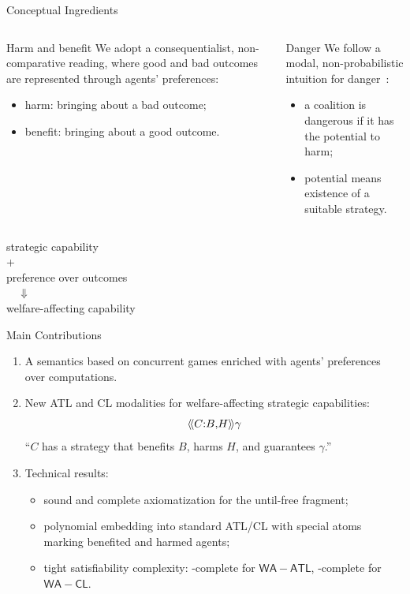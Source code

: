 \documentclass[aspectratio=169,10pt]{beamer}
\newcommand{\WATL}{\ensuremath{\mathsf{WA{-}ATL}}\xspace}
\newcommand{\WCL}{\ensuremath{\mathsf{WA{-}CL}}\xspace}
\begin{document}
\begin{frame}{Conceptual Ingredients}
  \begin{columns}[T,onlytextwidth]
    \begin{block}{Harm and benefit}
      We adopt a consequentialist, non-comparative reading, where good and bad outcomes are represented through agents' preferences:
      \begin{itemize}
        \item harm: bringing about a bad outcome;
        \item benefit: bringing about a good outcome.
      \end{itemize}
      
    \end{block}

    \begin{block}{Danger}
      We follow a modal, non-probabilistic intuition for danger~\citep{Fassio2025OnDanger,Garland2003RiseOfRisk,Peschard2022PhilosophyRisk}:
      \begin{itemize}
        \item a coalition is dangerous if it has the potential to harm;
        \item potential means existence of a suitable strategy.
      \end{itemize}
    \end{block}
  \end{columns}

  \vspace{0.7em}
  \centering
  \large
  strategic capability~\citep{alur2002alternating,GorankoDrimmelenATL}\\
  +\\
  preference over outcomes~\citep{DBLP:conf/ifaamas/LiLM25}\\  
    $\quad \Downarrow \quad$\\
    welfare-affecting capability
\end{frame}

\begin{frame}{Main Contributions}
  \begin{enumerate}
    \item A semantics based on concurrent games enriched with agents' preferences over computations.
    \item New ATL and CL modalities for welfare-affecting strategic capabilities:
      \[
        \langle\!\langle C{:}B{,}H  \rangle\!\rangle\gamma
      \]
      ``$C$ has a strategy that benefits $B$, harms $H$, and guarantees $\gamma$.''
    \item Technical results:
      \begin{itemize}
        \item sound and complete axiomatization for the until-free fragment;
        \item polynomial embedding into standard ATL/CL with special atoms marking benefited and harmed agents;
        \item tight satisfiability complexity: \Exptime-complete for \WATL, \Pspace-complete for \WCL.
      \end{itemize}
  \end{enumerate}
\end{frame}
\end{document}
